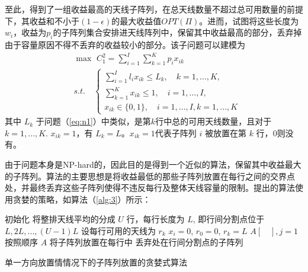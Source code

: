 至此，得到了一组收益最高的天线子阵列，在总天线数量不超过总可用数量的前提下，其收益和不小于$(1-\epsilon)$的最大收益值$OPT(\Pi)$。进而，试图将这些长度为 $w_i$，收益为$p_{i}$的子阵列集合安排进天线阵列中，保留其中收益最高的部分，丢弃掉由于容量原因不得不丢弃的收益较小的部分。该子问题可以建模为
\begin{equation}\label{eq:n3}
\begin{split}
&\max \,\, C_1^2 = \sum\limits_{i=1}^{I}\sum\limits_{k=1}^K p_{i} x_{ik}\\
&s.t.\quad  \left\{\begin{array}{l}
\sum\limits_{i=1}^{I} l_{i}x_{ik}\leq L_k, \quad k = 1,\dots,K,\\
\sum\limits_{k=1}^{K} x_{ik}\leq 1,\quad i = 1,\dots,I,\\
x_{ik}\in\{0,1\}, \quad  i=1,\dots,I, k = 1,\dots,K \end{array}\right.
\end{split}
\end{equation}
其中 $L_k$ 于问题（\ref{eq:n1}）中类似，是第$k$行中总的可用天线数量，且对于 $k=1,\dots,K$. $x_{ik} = 1$，有 $L_k=L$。$x_{ik} = 1$代表子阵列 $i$ 被放置在第 $k$ 行，$0$则没有。

由于问题本身是NP-hard的，因此目的是得到一个近似的算法，保留其中收益最大的子阵列。算法的主要思想是将收益最低的那些子阵列放置在每行之间的交界点处，并最终丢弃这些子阵列使得不违反每行及整体天线容量的限制。提出的算法使用贪婪的策略，如算法（\ref{alg:3}）所示：

\begin{algorithm}
\SetAlgoLined
{}
初始化\;
将整排天线平均的分成 $U$ 行，每行长度为 $L$, 即行间分割点位于 $L, 2L,...,(U-1)L$\;
设每行可用的天线为 $r_k$\;
$x_i = 0$, $r_0 = 0$, $r_k = L$\;
$A[\quad], j=1$ \;
按照顺序 $A$ 将子阵列放置在每行中\;
丢弃处在行间分割点的子阵列\;
\caption{单一方向放置情情况下的子阵列放置的贪婪式算法}\label{alg:3}
\end{algorithm}

